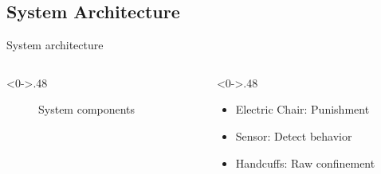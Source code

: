 \documentclass{beamer}
\begin{document}
\subsection{System Architecture}
\begin{frame}{System architecture}
  \begin{columns}[T] %
    \begin{column}<0->{.48\textwidth}
      \begin{figure}[thpb]
        \centering
        \caption{System components}
        \label{fig:system}
      \end{figure}
    \end{column}%
    \hfill%
    \begin{column}<0->{.48\textwidth}
      \begin{itemize}
        \item Electric Chair: Punishment
        \item Sensor: Detect behavior
        \item Handcuffs: Raw confinement
      \end{itemize}
    \end{column}%
  \end{columns}
\end{frame}
\end{document}
